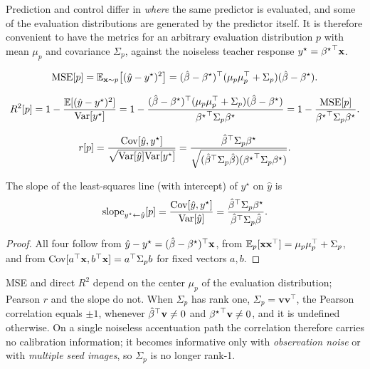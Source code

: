 Prediction and control differ in \emph{where} the same predictor is
evaluated, and some of the evaluation distributions are generated by the
predictor itself.  It is therefore convenient to have the metrics for an
arbitrary evaluation distribution $p$ with mean $\mu_p$ and covariance
$\Sigma_p$, against the noiseless teacher response $y^\star={{\beta^{\star}}}^\top\mathbf{x}$.

\begin{lem}
\label{lem:pred_error}
\[
\mathrm{MSE}[p]=\mathbb{E}_{\mathbf{x}\sim p}\big[(\hat y-y^\star)^2\big]
=(\hat{\beta}-{\beta^{\star}})^\top(\mu_p\mu_p^\top+\Sigma_p)(\hat{\beta}-{\beta^{\star}}).
\]
\end{lem}
\begin{lem}[Direct $R^2$]
\label{lem:R2_pred_obs}
\[
R^2[p]=1-\frac{\mathbb{E}[(\hat y-y^\star)^2]}{\mathrm{Var}[y^\star]}
=1-\frac{(\hat{\beta}-{\beta^{\star}})^\top(\mu_p\mu_p^\top+\Sigma_p)(\hat{\beta}-{\beta^{\star}})}{{{\beta^{\star}}}^\top\Sigma_p{\beta^{\star}}}
=1-\frac{\mathrm{MSE}[p]}{{{\beta^{\star}}}^\top\Sigma_p{\beta^{\star}}}.
\]
\end{lem}
\begin{lem}
\label{lem:Pearson-r_pred_obs}
\[
r[p]=\frac{\mathrm{Cov}[\hat y,y^\star]}{\sqrt{\mathrm{Var}[\hat y]\mathrm{Var}[y^\star]}}
=\frac{{\hat{\beta}}^\top\Sigma_p{\beta^{\star}}}
{\sqrt{({\hat{\beta}}^\top\Sigma_p\hat{\beta})({{\beta^{\star}}}^\top\Sigma_p{\beta^{\star}})}}.
\]
\end{lem}
\begin{lem}
\label{lem:linear_slope}
The slope of the least-squares line (with intercept) of $y^\star$ on
$\hat y$ is
\[
\mathrm{slope}_{y^\star\gets\hat y}[p]=\frac{\mathrm{Cov}[\hat y,y^\star]}{\mathrm{Var}[\hat y]}
=\frac{{\hat{\beta}}^\top\Sigma_p{\beta^{\star}}}{{\hat{\beta}}^\top\Sigma_p\hat{\beta}}.
\]
\end{lem}
\begin{proof}
All four follow from $\hat y-y^\star=(\hat{\beta}-{\beta^{\star}})^\top\mathbf{x}$, from
$\mathbb{E}_p[\mathbf{x}\mathbf{x}^\top]=\mu_p\mu_p^\top+\Sigma_p$, and from
$\mathrm{Cov}[a^\top\mathbf{x},b^\top\mathbf{x}]=a^\top\Sigma_pb$ for fixed vectors $a,b$.
\end{proof}

\begin{remark}
\label{rem:app-metrics}
MSE and direct $R^2$ depend on the center $\mu_p$ of the evaluation
distribution; Pearson $r$ and the slope do not.  When $\Sigma_p$ has rank
one, $\Sigma_p=\mathbf v\mathbf v^\top$, the Pearson correlation equals
$\pm1$, whenever ${\hat{\beta}}^\top\mathbf v\ne0$ and ${{\beta^{\star}}}^\top\mathbf v\ne0$,
and it is undefined otherwise.  
On a single noiseless accentuation path the correlation therefore carries no calibration information; 
it becomes informative only with \textit{observation noise} or with \textit{multiple seed images}, so $\Sigma_p$ is no longer rank-1.
\end{remark}

